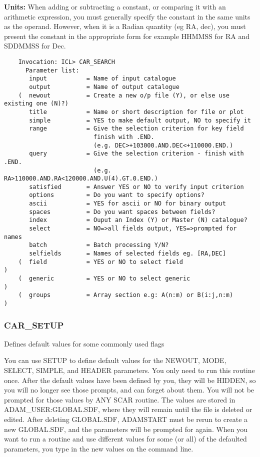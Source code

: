 {\bf Units:} When adding or subtracting a constant, or
comparing it with an arithmetic expression, you must generally specify the
constant in the same units as the operand.
However, when it is a Radian quantity (eg RA, dec), you must present
the constant in the appropriate form for example HHMMSS for RA
and SDDMMSS for Dec.
\begin{verbatim}
    Invocation: ICL> CAR_SEARCH
      Parameter list:
       input           = Name of input catalogue
       output          = Name of output catalogue
    (  newout          = Create a new o/p file (Y), or else use existing one (N)?)
       title           = Name or short description for file or plot
       simple          = YES to make default output, NO to specify it
       range           = Give the selection criterion for key field
                         finish with .END.
                         (e.g. DEC>+103000.AND.DEC<+110000.END.)
       query           = Give the selection criterion - finish with .END.
                         (e.g. RA>110000.AND.RA<120000.AND.U(4).GT.0.END.)
       satisfied       = Answer YES or NO to verify input criterion
       options         = Do you want to specify options?
       ascii           = YES for ascii or NO for binary output
       spaces          = Do you want spaces between fields?
       index           = Ouput an Index (Y) or Master (N) catalogue?
       select          = NO=>all fields output, YES=>prompted for names
       batch           = Batch processing Y/N?
       selfields       = Names of selected fields eg. [RA,DEC]
    (  field           = YES or NO to select field                               )
    (  generic         = YES or NO to select generic                             )
    (  groups          = Array section e.g: A(n:m) or B(i:j,n:m)                 )
\end{verbatim}

\subsubsection{CAR\_SETUP}

Defines default values for some commonly used flags

You can use SETUP to define default values for the NEWOUT, MODE, SELECT,
SIMPLE, and HEADER parameters.
You only need to run this routine once.
After the default values have been defined by you, they will be HIDDEN, so you
will no longer see those prompts, and can forget about them.
You will not be prompted for those values by ANY SCAR routine.
The values are stored in ADAM\_USER:GLOBAL.SDF, where they will remain until
the file is deleted or edited.
After deleting GLOBAL.SDF, ADAMSTART must be rerun to create a new GLOBAL.SDF,
and the parameters will be prompted for again.
When you want to run a routine and use different values for some (or all) of
the defaulted parameters, you type in the new values on the command line.

